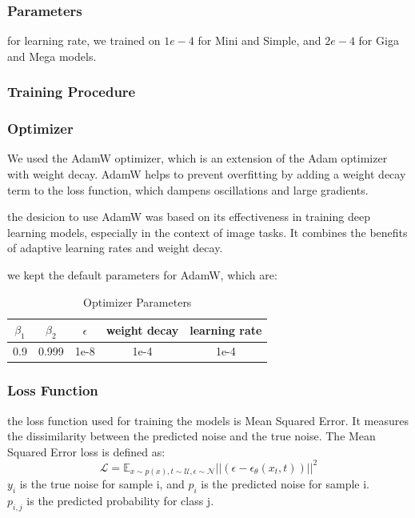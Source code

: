 \documentclass[twocolumn,superscriptaddress,aps]{revtex4-1}
\begin{document}
\subsubsection{Parameters}
for learning rate, we trained on $1e-4$ for Mini and Simple, and $2e-4$ for Giga and Mega models.

\subsubsection{Training Procedure}

\subsubsection{Optimizer}
We used the AdamW optimizer, which is an extension of the Adam optimizer with weight decay. AdamW helps to prevent overfitting by adding a weight decay term to the loss function, which dampens oscillations and large gradients.

the desicion to use AdamW was based on its effectiveness in training deep learning models, especially in the context of image tasks. It combines the benefits of adaptive learning rates and weight decay.

we kept the default parameters for AdamW, which are:
\begin{table}[h]
    \centering
    \begin{tabular}{|c|c|c|c|c|}
        \hline
        $\beta_1$ & $\beta_2$ & $\epsilon$ & weight decay & learning rate \\
        \hline
        0.9 & 0.999 & 1e-8 & 1e-4 & 1e-4 \\
        \hline
    \end{tabular}
    \caption{Optimizer Parameters}
    \label{tab:optimizer_params}
\end{table}

\subsubsection{Loss Function}
the loss function used for training the models is Mean Squared Error. It measures the dissimilarity between the predicted noise and the true noise.
The Mean Squared Error loss is defined as:
\[
\mathcal{L} = \mathbb{E}_{x \sim p(x), t \sim \mathcal{U}, \epsilon \sim \mathcal{N} } ||(\epsilon - \epsilon_\theta (x_t, t))||^2
\]
$y_{i}$ is the true noise for sample i, and $p_{i}$ is the predicted noise for sample i.\\
$p_{i,j}$ is the predicted probability for class j.
\end{document}
